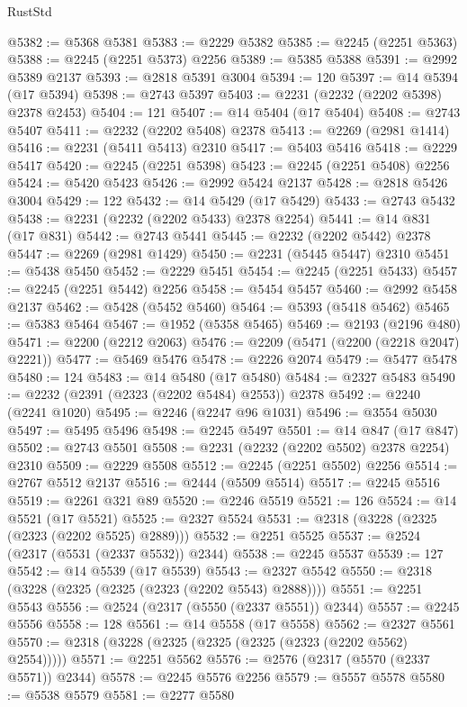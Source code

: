 \begin{lexlean}{RustStd}
\begin{coremodule}
@5382 := @5368 @5381
@5383 := @2229 @5382
@5385 := @2245 (@2251 @5363)
@5388 := @2245 (@2251 @5373) @2256
@5389 := @5385 @5388
@5391 := @2992 @5389 @2137
@5393 := @2818 @5391 @3004
@5394 := 120
@5397 := @14 @5394 (@17 @5394)
@5398 := @2743 @5397
@5403 := @2231 (@2232 (@2202 @5398) @2378 @2453)
@5404 := 121
@5407 := @14 @5404 (@17 @5404)
@5408 := @2743 @5407
@5411 := @2232 (@2202 @5408) @2378
@5413 := @2269 (@2981 @1414)
@5416 := @2231 (@5411 @5413) @2310
@5417 := @5403 @5416
@5418 := @2229 @5417
@5420 := @2245 (@2251 @5398)
@5423 := @2245 (@2251 @5408) @2256
@5424 := @5420 @5423
@5426 := @2992 @5424 @2137
@5428 := @2818 @5426 @3004
@5429 := 122
@5432 := @14 @5429 (@17 @5429)
@5433 := @2743 @5432
@5438 := @2231 (@2232 (@2202 @5433) @2378 @2254)
@5441 := @14 @831 (@17 @831)
@5442 := @2743 @5441
@5445 := @2232 (@2202 @5442) @2378
@5447 := @2269 (@2981 @1429)
@5450 := @2231 (@5445 @5447) @2310
@5451 := @5438 @5450
@5452 := @2229 @5451
@5454 := @2245 (@2251 @5433)
@5457 := @2245 (@2251 @5442) @2256
@5458 := @5454 @5457
@5460 := @2992 @5458 @2137
@5462 := @5428 (@5452 @5460)
@5464 := @5393 (@5418 @5462)
@5465 := @5383 @5464
@5467 := @1952 (@5358 @5465)
@5469 := @2193 (@2196 @480)
@5471 := @2200 (@2212 @2063)
@5476 := @2209 (@5471 (@2200 (@2218 @2047) @2221))
@5477 := @5469 @5476
@5478 := @2226 @2074
@5479 := @5477 @5478
@5480 := 124
@5483 := @14 @5480 (@17 @5480)
@5484 := @2327 @5483
@5490 := @2232 (@2391 (@2323 (@2202 @5484) @2553)) @2378
@5492 := @2240 (@2241 @1020)
@5495 := @2246 (@2247 @96 @1031)
@5496 := @3554 @5030
@5497 := @5495 @5496
@5498 := @2245 @5497
@5501 := @14 @847 (@17 @847)
@5502 := @2743 @5501
@5508 := @2231 (@2232 (@2202 @5502) @2378 @2254) @2310
@5509 := @2229 @5508
@5512 := @2245 (@2251 @5502) @2256
@5514 := @2767 @5512 @2137
@5516 := @2444 (@5509 @5514)
@5517 := @2245 @5516
@5519 := @2261 @321 @89
@5520 := @2246 @5519
@5521 := 126
@5524 := @14 @5521 (@17 @5521)
@5525 := @2327 @5524
@5531 := @2318 (@3228 (@2325 (@2323 (@2202 @5525) @2889)))
@5532 := @2251 @5525
@5537 := @2524 (@2317 (@5531 (@2337 @5532)) @2344)
@5538 := @2245 @5537
@5539 := 127
@5542 := @14 @5539 (@17 @5539)
@5543 := @2327 @5542
@5550 := @2318 (@3228 (@2325 (@2325 (@2323 (@2202 @5543) @2888))))
@5551 := @2251 @5543
@5556 := @2524 (@2317 (@5550 (@2337 @5551)) @2344)
@5557 := @2245 @5556
@5558 := 128
@5561 := @14 @5558 (@17 @5558)
@5562 := @2327 @5561
@5570 := @2318 (@3228 (@2325 (@2325 (@2325 (@2323 (@2202 @5562) @2554)))))
@5571 := @2251 @5562
@5576 := @2576 (@2317 (@5570 (@2337 @5571)) @2344)
@5578 := @2245 @5576 @2256
@5579 := @5557 @5578
@5580 := @5538 @5579
@5581 := @2277 @5580

\end{coremodule}
\end{lexlean}
